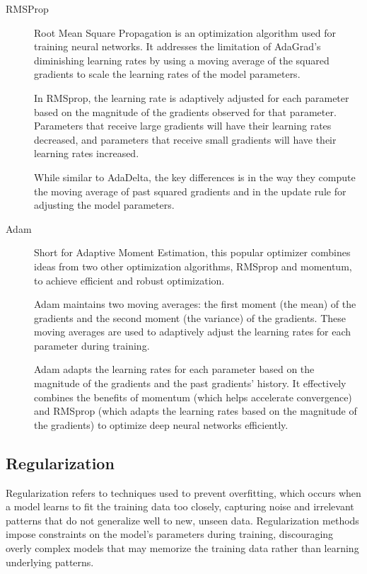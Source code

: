 \documentclass[a4paper]{report}
\begin{document}
\begin{description}
\item[RMSProp]
Root Mean Square Propagation is an optimization algorithm used for training neural networks. It addresses the limitation of AdaGrad's diminishing learning rates by using a moving average of the squared gradients to scale the learning rates of the model parameters.

In RMSprop, the learning rate is adaptively adjusted for each parameter based on the magnitude of the gradients observed for that parameter. Parameters that receive large gradients will have their learning rates decreased, and parameters that receive small gradients will have their learning rates increased.

While similar to AdaDelta, the key differences is in the way they compute the moving average of past squared gradients and in the update rule for adjusting the model parameters.

\item[Adam]
Short for Adaptive Moment Estimation, this popular optimizer combines ideas from two other optimization algorithms, RMSprop and momentum, to achieve efficient and robust optimization.

Adam maintains two moving averages: the first moment (the mean) of the gradients and the second moment (the variance) of the gradients. These moving averages are used to adaptively adjust the learning rates for each parameter during training.

Adam adapts the learning rates for each parameter based on the magnitude of the gradients and the past gradients' history. It effectively combines the benefits of momentum (which helps accelerate convergence) and RMSprop (which adapts the learning rates based on the magnitude of the gradients) to optimize deep neural networks efficiently.

\end{description}

\subsection*{Regularization}
Regularization refers to techniques used to prevent overfitting, which occurs when a model learns to fit the training data too closely, capturing noise and irrelevant patterns that do not generalize well to new, unseen data. Regularization methods impose constraints on the model's parameters during training, discouraging overly complex models that may memorize the training data rather than learning underlying patterns.
\end{document}
